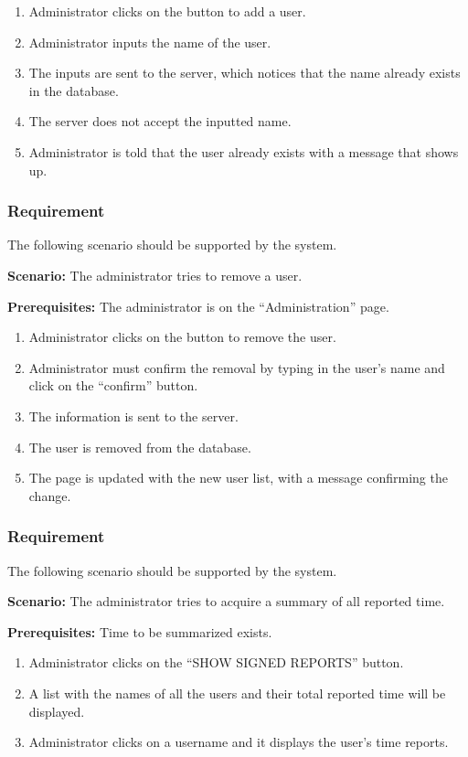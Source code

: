 \documentclass{article}
\begin{document}
\begin{enumerate}
    \item Administrator clicks on the button to add a user.
    \item Administrator inputs the name of the user.
    \item The inputs are sent to the server, which notices that the name already exists in the database.
    \item The server does not accept the inputted name.
    \item Administrator is told that the user already exists with a message that shows up.
\end{enumerate}

\subsubsection{Requirement}
The following scenario should be supported by the system.

\textbf{Scenario:} The administrator tries to remove a user.

\textbf{Prerequisites:} The administrator is on the “Administration” page.

\begin{enumerate}
    \item Administrator clicks on the button to remove the user.
    \item Administrator must confirm the removal by typing in the user’s name and click on the “confirm” button.
    \item The information is sent to the server.
    \item The user is removed from the database.
    \item The page is updated with the new user list, with a message confirming the change.
\end{enumerate}


\subsubsection{Requirement}
The following scenario should be supported by the system.

\textbf{Scenario:} The administrator tries to acquire a summary of all reported time.

\textbf{Prerequisites:} Time to be summarized exists.

\begin{enumerate}
    \item Administrator clicks on the “SHOW SIGNED REPORTS” button.
    \item A list with the names of all the users and their total reported time will be displayed.
    \item Administrator clicks on a username and it displays the user’s time reports.
\end{enumerate}
\end{document}
